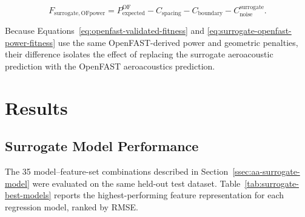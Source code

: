 \documentclass[11pt]{article}
\begin{document}
\begin{equation}
    F_{\mathrm{surrogate,OFpower}}
    =
    P_{\mathrm{expected}}^{\mathrm{OF}}
    -
    C_{\mathrm{spacing}}
    -
    C_{\mathrm{boundary}}
    -
    C_{\mathrm{noise}}^{\mathrm{surrogate}}.
    \label{eq:surrogate-openfast-power-fitness}
\end{equation}

Because Equations~\ref{eq:openfast-validated-fitness} and \ref{eq:surrogate-openfast-power-fitness} use the same OpenFAST-derived power and geometric penalties, their difference isolates the effect of replacing the surrogate aeroacoustic prediction with the OpenFAST aeroacoustics prediction.


\section{Results}

\subsection{Surrogate Model Performance}
\label{ssec:surrogate-results}

The 35 model--feature-set combinations described in Section~\ref{ssec:aa-surrogate-model} were evaluated on the same held-out test dataset. Table~\ref{tab:surrogate-best-models} reports the highest-performing feature representation for each regression model, ranked by RMSE.
\end{document}
